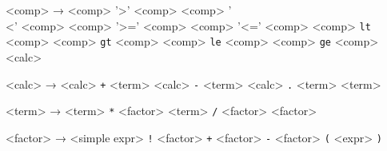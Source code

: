 <comp>           → <comp> '>' <comp>
                 \alt <comp> '\\<' <comp>
                 \alt <comp> '>=' <comp>
                 \alt <comp> '<=' <comp>
                 \alt <comp> \texttt{lt} <comp>
                 \alt <comp> \texttt{gt} <comp>
                 \alt <comp> \texttt{le} <comp>
                 \alt <comp> \texttt{ge} <comp>
                 \alt <calc>

<calc>           → <calc> \texttt{+} <term>
                 \alt <calc> \texttt{-} <term>
                 \alt <calc> \texttt{.} <term>
                 \alt <term>
                 

<term>           → <term> \texttt{*} <factor>
                 \alt <term> \texttt{/} <factor>
                 \alt <factor>

<factor>         → <simple expr>
                 \alt \texttt{!} <factor>
                 \alt \texttt{+} <factor>
                 \alt \texttt{-} <factor>
                 \alt \texttt{(} <expr> \texttt{)}
